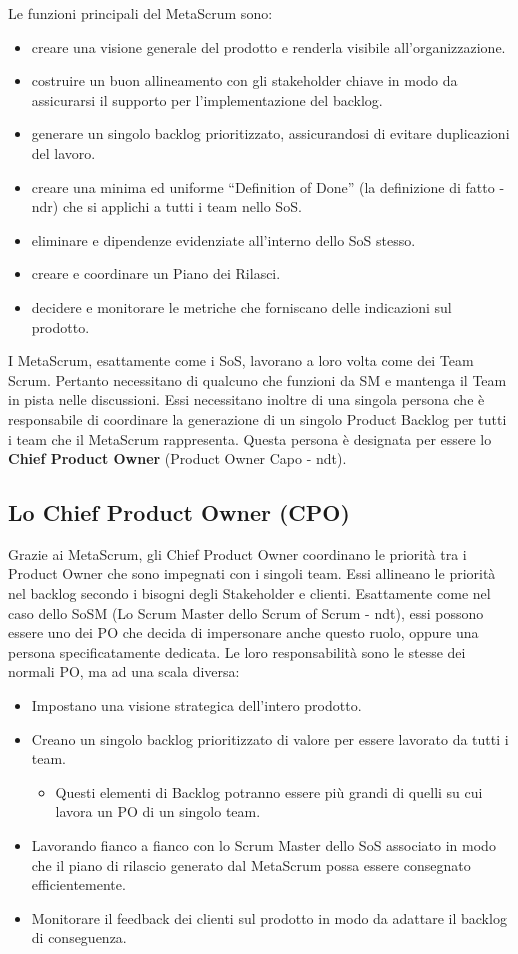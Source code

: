 \documentclass[12pt,a4paper,parskip=full]{scrartcl}
\begin{document}
Le funzioni principali del MetaScrum sono:
\begin{itemize}
\item creare una visione generale del prodotto e renderla visibile all'organizzazione.
\item costruire un buon allineamento con gli stakeholder chiave in modo da assicurarsi il supporto per l'implementazione del backlog.
\item generare un singolo backlog prioritizzato, assicurandosi di evitare duplicazioni del lavoro.
\item creare una minima ed uniforme ``Definition of Done'' (la definizione di fatto - ndr) che si applichi a tutti i team nello SoS.
\item eliminare e dipendenze evidenziate all'interno dello SoS stesso.
\item creare e coordinare un Piano dei Rilasci.
\item decidere e monitorare le metriche che forniscano delle indicazioni sul prodotto.
\end{itemize}
I MetaScrum, esattamente come i SoS, lavorano a loro volta come dei Team Scrum. Pertanto necessitano di qualcuno che funzioni da SM e mantenga il Team in pista nelle discussioni. Essi necessitano inoltre di una singola persona che è responsabile di coordinare la generazione di un singolo Product Backlog per tutti i team che il MetaScrum rappresenta. Questa persona è designata per essere lo \textbf{Chief Product Owner} (Product Owner Capo - ndt).

\subsection{Lo Chief Product Owner (CPO)}
Grazie ai MetaScrum, gli Chief Product Owner coordinano le priorità tra i Product Owner che sono impegnati con i singoli team. Essi allineano le priorità nel backlog secondo i bisogni degli Stakeholder e clienti. Esattamente come nel caso dello SoSM (Lo Scrum Master dello Scrum of Scrum - ndt), essi possono essere uno dei PO che decida di impersonare anche questo ruolo, oppure una persona specificatamente dedicata. Le loro responsabilità sono le stesse dei normali PO, ma ad una scala diversa: 
\begin{itemize}
\item Impostano una visione strategica dell'intero prodotto.
\item Creano un singolo backlog prioritizzato di valore per essere lavorato da tutti i team.
\begin{itemize}
\item Questi elementi di Backlog potranno essere più grandi di quelli su cui lavora un PO di un singolo team.
\end{itemize}
\item Lavorando fianco a fianco con lo Scrum Master dello SoS associato in modo che il piano di rilascio generato dal MetaScrum possa essere consegnato efficientemente.
\item Monitorare il feedback dei clienti sul prodotto in modo da adattare il backlog di conseguenza.
\end{itemize}
\end{document}
